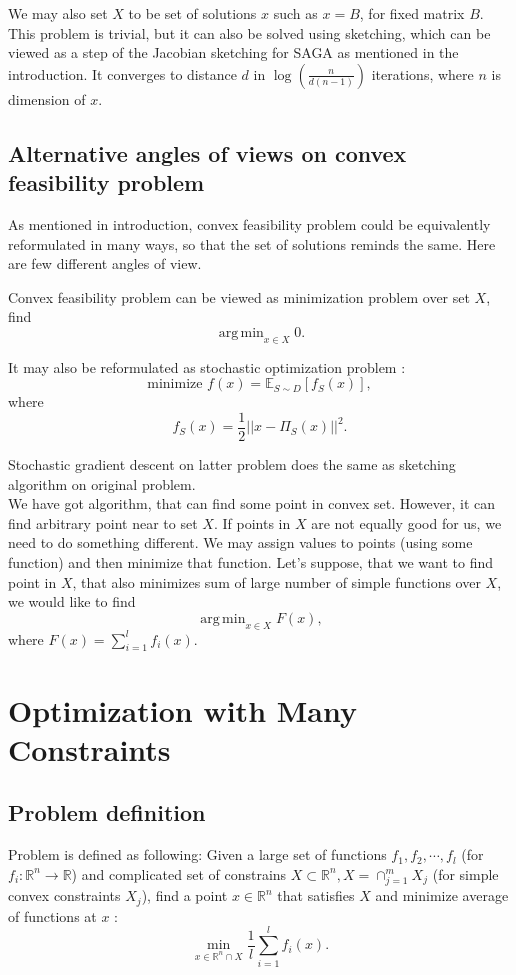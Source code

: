 \documentclass[11pt]{book}
\newcommand{\R}{\mathbb{R}}
\newcommand{\E}{\mathbb{E}}
\DeclareMathOperator*{\argmin}{arg\,min}
\theoremstyle{definition}
\begin{document}
	We may also set $X$ to be set of solutions $x$ such as $x=B$, for fixed matrix $B$. This problem is trivial, but it can also be solved using sketching, which can be viewed as a step of the Jacobian sketching for SAGA as mentioned in the introduction. It converges to distance $d$ in $\log(\frac{n}{d(n-1)})$\label{xIsB} iterations, where $n$ is dimension of $x$.\\
	
	\section{Alternative angles of views on convex feasibility problem}
	As mentioned in introduction, convex feasibility problem could be equivalently reformulated in many ways, so that the set of solutions reminds the same. Here are few different angles of view.
	
	Convex feasibility problem can be viewed as minimization problem over set $X$, find $$\argmin_{x \in X} 0.$$
	
	It may also be reformulated as stochastic optimization problem \cite{sketchAndProject}: $$\text{minimize } f(x)=\E_{S \sim D}[f_S(x)],$$ where $$f_S(x) = \frac{1}{2}||x-\Pi_S(x)||^2.$$
	
	
	Stochastic gradient descent on latter problem does the same as sketching algorithm on original problem.\\
	
	We have got algorithm, that can find some point in convex set. However, it can find arbitrary point near to set $X$. If points in $X$ are not equally good for us, we need to do something different. We may assign values to points (using some function) and then minimize that function. Let's suppose, that we want to find point in $X$, that also minimizes sum of large number of simple functions over $X$, we would like to find $$\argmin_{x \in X} F(x),$$ where $F(x)=\sum_{i=1}^{l}f_i(x).$
	
	
	
	\chapter{Optimization with Many Constraints}
	
	\section{Problem definition}
	Problem is defined as following: Given a large set of functions $f_1,f_2,\cdots,f_l$ (for $f_i: \R^n \rightarrow \R$) and complicated set of constrains $X \subset \R^n, X = \cap_{j=1}^m X_j$ (for simple convex constraints $X_j$), find a point $x \in \R^n$ that satisfies $X$ and minimize average of functions at $x$ \cite{kosto}: $$ \min_{x \in \R^n \cap X} \frac{1}{l}\sum_{i=1}^l f_i(x).$$
	
\end{document}
